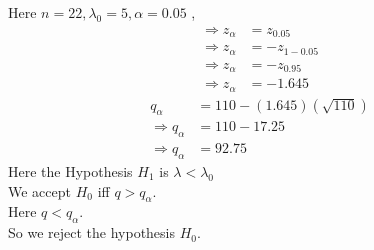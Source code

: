 \documentclass{beamer}
\begin{document}
\begin{frame}
Here $ n=22,\lambda_0 = 5,\alpha = 0.05 $ ,
\begin{align}
\Rightarrow z_\alpha &= z_{0.05} \\
\Rightarrow z_\alpha &= -z_{1-0.05} \\
\Rightarrow z_\alpha &= -z_{0.95} \\
\Rightarrow z_\alpha &= -1.645
\end{align}
\begin{align}
q_\alpha &= 110 - (1.645)(\sqrt{110}) \\
\Rightarrow q_\alpha &= 110 - 17.25 \\
\Rightarrow q_\alpha &= 92.75
\end{align}
Here the Hypothesis $H_1$ is $\lambda < \lambda_0$ \\
We accept $H_0$ iff $q > q_\alpha$. \\
Here $ q < q_\alpha $. \\
So we reject the hypothesis $H_0$.
\end{frame}
\end{document}
